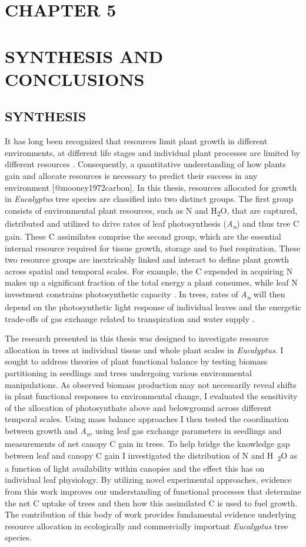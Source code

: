 \documentclass[a4paper]{article}\usepackage[]{graphicx}\usepackage[]{color}
\begin{document}
\section*{CHAPTER 5 \\ \mbox{ }\\ SYNTHESIS AND CONCLUSIONS}
\subsection*{SYNTHESIS}
It has long been recognized that resources limit plant growth in different environments, at different life stages and individual plant processes are limited by different resources \citep{bazzaz2000reproductive}. Consequently, a quantitative understanding of how plants gain and allocate resources is necessary to predict their success in any environment [@mooney1972carbon]. In this thesis, resources allocated for growth in \textit{Eucalyptus} tree species are classified into two distinct groups. The first group consists of environmental plant resources, such as N and H\textsubscript{2}O, that are captured, distributed and utilized to drive rates of leaf photosynthesis (\textit{A\textsubscript{n}}) and thus tree C gain. These C assimilates comprise the second group, which are the essential internal resource required for tissue growth, storage and to fuel respiration. These two resource groups are inextricably linked and interact to define plant growth across spatial and temporal scales. For example, the C expended in acquiring N makes up a significant fraction of the total energy a plant consumes, while leaf N investment constrains photosynthetic capacity \citep{chapin1987plant}. In trees, rates of \textit{A\textsubscript{n}} will then depend on the photosynthetic light response of individual leaves and the energetic trade-offs of gas exchange related to transpiration and water supply \citep{givnish1988adaptation}.

The research presented in this thesis was designed to investigate resource allocation in trees at individual tissue and whole plant scales in \textit{Eucalyptus}. I sought to address theories of plant functional balance by testing biomass partitioning in seedlings and trees undergoing various environmental manipulations. As observed biomass production may not necessarily reveal shifts in plant functional responses to environmental change, I evaluated the sensitivity of the allocation of photosynthate above and belowground across different temporal scales. Using mass balance approaches I then tested the coordination between growth and \textit{A\textsubscript{n}}, using leaf gas exchange parameters in seedlings and measurements of net canopy C gain in trees. To help bridge the knowledge gap between leaf and canopy C gain I investigated the distribution of N and H~\textsubscript{2}O as a function of light availability within canopies and the effect this has on individual leaf physiology. By utilizing novel experimental approaches, evidence from this work improves our understanding of functional processes that determine the net C uptake of trees and then how this assimilated C is used to fuel growth. The contribution of this body of work provides fundamental evidence underlying resource allocation in ecologically and commercially important \textit{Eucalyptus} tree species.
\end{document}
